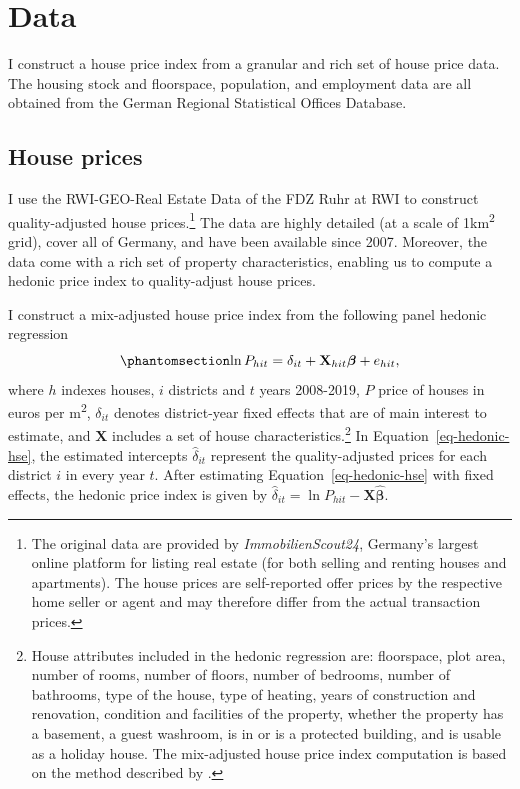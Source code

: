 \documentclass[
  12pt,
]{article}
\begin{document}
\section{Data}\label{data}

I construct a house price index from a granular and rich set of house
price data. The housing stock and floorspace, population, and employment
data are all obtained from the German Regional Statistical Offices
Database.

\subsection{House prices}\label{sec-hedonic-hse}

I use the RWI-GEO-Real Estate Data of the FDZ Ruhr at RWI
\citep{rwi_redhk_2020} to construct quality-adjusted house
prices.\footnote{The original data are provided by
  \emph{ImmobilienScout24}, Germany's largest online platform for
  listing real estate (for both selling and renting houses and
  apartments). The house prices are self-reported offer prices by the
  respective home seller or agent and may therefore differ from the
  actual transaction prices.} The data are highly detailed (at a scale
of 1km\textsuperscript{2} grid), cover all of Germany, and have been
available since 2007. Moreover, the data come with a rich set of
property characteristics, enabling us to compute a hedonic price index
to quality-adjust house prices.

I construct a mix-adjusted house price index from the following panel
hedonic regression
\begin{equation}\protect\phantomsection\label{eq-hedonic-hse}{
\ln P_{hit} = \delta_{it} + \mathbf{X}_{hit}\boldsymbol{\beta} + e_{hit},
}\end{equation} where \(h\) indexes houses, \(i\) districts and \(t\)
years 2008-2019, \(P\) price of houses in euros per
m\textsuperscript{2}, \(\delta_{it}\) denotes district-year fixed
effects that are of main interest to estimate, and \(\mathbf{X}\)
includes a set of house characteristics.\footnote{House attributes
  included in the hedonic regression are: floorspace, plot area, number
  of rooms, number of floors, number of bedrooms, number of bathrooms,
  type of the house, type of heating, years of construction and
  renovation, condition and facilities of the property, whether the
  property has a basement, a guest washroom, is in or is a protected
  building, and is usable as a holiday house. The mix-adjusted house
  price index computation is based on the method described by
  \citet{ahlfeldt_etal_2020}.} In Equation~\ref{eq-hedonic-hse}, the
estimated intercepts \(\widehat{\delta}_{it}\) represent the
quality-adjusted prices for each district \(i\) in every year \(t\).
After estimating Equation~\ref{eq-hedonic-hse} with fixed effects, the
hedonic price index is given by
\(\widehat{\delta}_{it} = \ln P_{hit} - \mathbf{X}\boldsymbol{\widehat{\beta}}\).
\end{document}
